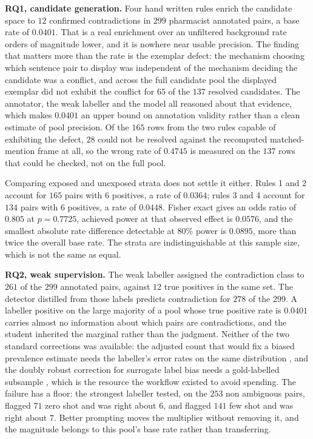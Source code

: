 \textbf{RQ1, candidate generation.} Four hand written rules enrich the candidate
space to $12$ confirmed contradictions in $299$ pharmacist annotated pairs, a
base rate of $0.0401$. That is a real enrichment over an unfiltered background
rate orders of magnitude lower, and it is nowhere near usable precision. The
finding that matters more than the rate is the exemplar defect: the mechanism
choosing which sentence pair to display was independent of the mechanism
deciding the candidate was a conflict, and across the full candidate pool the
displayed exemplar did not exhibit the conflict for $65$ of the $137$ resolved candidates. The
annotator, the weak labeller and the model all reasoned about that evidence,
which makes $0.0401$ an upper bound on annotation validity rather than a clean
estimate of pool precision. Of the $165$ rows from the two rules capable of
exhibiting the defect, $28$ could not be resolved against the recomputed
matched-mention frame at all, so the wrong rate of $0.4745$ is measured on the
$137$ rows that could be checked, not on the full pool.

Comparing exposed and unexposed strata does not settle it either. Rules 1 and 2
account for $165$ pairs with $6$ positives, a rate of $0.0364$; rules 3 and 4
account for $134$ pairs with $6$ positives, a rate of $0.0448$. Fisher exact
gives an odds ratio of $0.805$ at $p = 0.7725$, achieved power at that observed
effect is $0.0576$, and the smallest absolute rate difference detectable at
$80\%$ power is $0.0895$, more than twice the overall base rate. The strata are
indistinguishable at this sample size, which is not the same as equal.

\textbf{RQ2, weak supervision.} The weak labeller assigned the contradiction
class to $261$ of the $299$ annotated pairs, against $12$ true positives in the
same set. The detector distilled from those labels predicts contradiction for
$278$ of the $299$. A labeller positive on the large majority of a pool whose
true positive rate is $0.0401$ carries almost no information about which pairs
are contradictions, and the student inherited the marginal rather than the
judgment. Neither of the two standard corrections was available: the adjusted
count that would fix a biased prevalence estimate needs the labeller's error
rates on the same distribution \citep{forman2008quantifying}, and the
doubly robust correction for surrogate label bias needs a gold-labelled
subsample \citep{egami2023surrogates}, which is the resource the workflow
existed to avoid spending. The failure has a floor: the strongest labeller tested, on the $253$
non ambiguous pairs, flagged $71$ zero shot and was right about $6$, and flagged
$141$ few shot and was right about $7$. Better prompting moves the multiplier
without removing it, and the magnitude belongs to this pool's base rate rather
than transferring.

